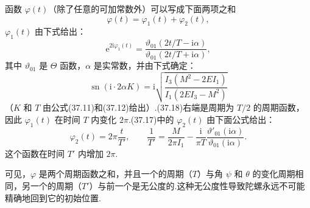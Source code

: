 函数 $\varphi(t)$（除了任意的可加常数外）可以写成下面两项之和
\begin{equation}
  \varphi(t)=\varphi_1(t)+\varphi_2(t),
\end{equation}
$\varphi_1(t)$ 由下式给出：
\begin{equation}
  \mathrm{e}^{2\mathrm{i}\varphi_1(t)}
  =\frac{\vartheta_{01}\left(2t/T-\mathrm{i}\alpha\right)}
  {\vartheta_{01}\left(2t/T+\mathrm{i}\alpha\right)},
\end{equation}
其中 $\vartheta_{01}$ 是 $\Theta$ 函数，$\alpha$ 是实常数，并由下式确定：
\begin{equation}
  \operatorname{sn}(\mathrm{i}\cdot 2\alpha K)
  =\mathrm{i}\sqrt{\frac{I_3\left(M^2-2EI_1\right)}
  {I_1\left(2EI_3-M^2\right)}}
\end{equation}
（$K$ 和 $T$ 由公式(37.11)和(37.12)给出）.(37.18)右端是周期为 $T/2$ 的周期函数，因此 $\varphi_1(t)$ 在时间 $T$ 内变化 $2\pi$.(37.17)中的 $\varphi_2(t)$ 由下面公式给出：
\begin{equation}
  \varphi_2(t)=2\pi\frac{t}{T'},\qquad
  \frac{1}{T'}=\frac{M}{2\pi I_1}
  -\frac{\mathrm{i}}{\pi T}
  \frac{\vartheta'_{01}(\mathrm{i}\alpha)}{\vartheta_{01}(\mathrm{i}\alpha)}.
\end{equation}
这个函数在时间 $T'$ 内增加 $2\pi$.

可见，$\varphi$ 是两个周期函数之和，并且一个的周期（$T$）与角 $\psi$ 和 $\theta$ 的变化周期相同，另一个的周期（$T'$）与前一个是无公度的.这种无公度性导致陀螺永远不可能精确地回到它的初始位置.


